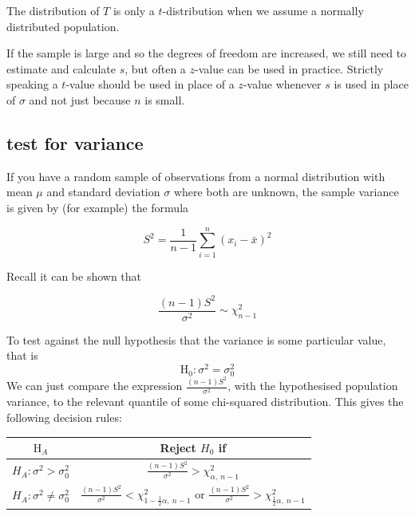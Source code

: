 \documentclass[
]{book}
\theoremstyle{definition}
\theoremstyle{definition}
\theoremstyle{definition}
\theoremstyle{definition}
\theoremstyle{remark}
\begin{document}
The distribution of \(T\) is only a \(t\)-distribution when we assume a normally distributed population.

If the sample is large and so the degrees of freedom are increased, we still need to estimate and calculate \(s\), but often a \(z\)-value can be used in practice. Strictly speaking a \(t\)-value should be used in place of a \(z\)-value whenever \(s\) is used in place of \(\sigma\) and not just because \(n\) is small.

\hypertarget{test-for-variance}{%
\subsection{test for variance}\label{test-for-variance}}

If you have a random sample of observations from a normal distribution with mean \(\mu\) and standard deviation \(\sigma\) where both are unknown, the sample variance is given by (for example) the formula

\[S^2 = \frac{1}{n-1}\sum_{i=1}^{n}(x_i-\bar{x})^2\]

Recall it can be shown that

\[\frac{(n-1)S^2}{\sigma^2}\sim\chi^2_{n-1}\]

To test against the null hypothesis that the variance is some particular value, that is
\[\text{H}_0: \sigma^2 = \sigma_0^2\]
We can just compare the expression \(\frac{(n-1)S^2}{\sigma^2}\), with the hypothesised population variance, to the relevant quantile of some chi-squared distribution. This gives the following decision rules:

\begin{longtable}[]{@{}cc@{}}
\toprule
\begin{minipage}[b]{0.43\columnwidth}\centering
\(\text{H}_{A}\)\strut
\end{minipage} & \begin{minipage}[b]{0.51\columnwidth}\centering
Reject \(H_{0}\) if\strut
\end{minipage}\tabularnewline
\midrule
\endhead
\begin{minipage}[t]{0.43\columnwidth}\centering
\(H_{A}: \sigma^2 > \sigma^2_0\)\strut
\end{minipage} & \begin{minipage}[t]{0.51\columnwidth}\centering
\(\frac{(n-1)S^2}{\sigma^2}>\chi^2_{\alpha, \ n-1}\)\strut
\end{minipage}\tabularnewline
\begin{minipage}[t]{0.43\columnwidth}\centering
\(H_{A}: \sigma^2 \neq \sigma^2_0\)\strut
\end{minipage} & \begin{minipage}[t]{0.51\columnwidth}\centering
\(\frac{(n-1)S^2}{\sigma^2}<\chi^2_{1-\frac{1}{2}\alpha, \ n-1}\) or \(\frac{(n-1)S^2}{\sigma^2}>\chi^2_{\frac{1}{2}\alpha, \ n-1}\)\strut
\end{minipage}\tabularnewline
\bottomrule
\end{longtable}
\end{document}
